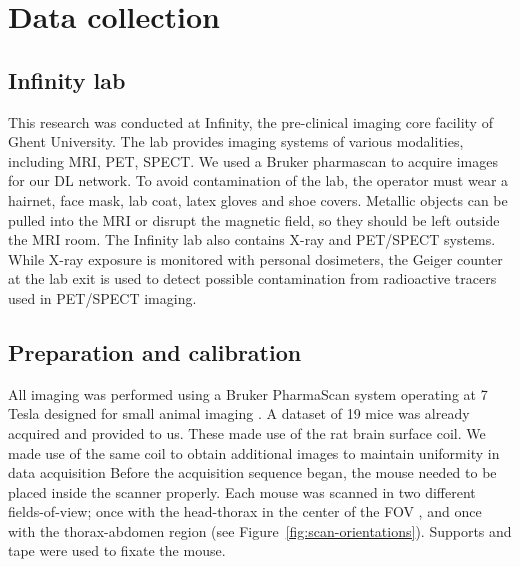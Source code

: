 \documentclass[twocolumn]{article}
\begin{document}
\section{Data collection}
\subsection{Infinity lab}

This research was conducted at Infinity, the pre-clinical imaging core facility of Ghent University. 
The lab provides imaging systems of various modalities, including MRI, PET, SPECT.
We used a Bruker pharmascan to acquire images for our DL network. To avoid contamination of the lab, the operator must wear a hairnet, face mask, lab coat, latex gloves and shoe covers. 
Metallic objects can be pulled into the MRI or disrupt the magnetic field, so they should be left outside the MRI room. 
The Infinity lab also contains X-ray and PET/SPECT systems. 
While X-ray exposure is monitored with personal dosimeters, the Geiger counter at the lab exit is used to detect possible contamination from radioactive tracers used in PET/SPECT imaging.

\subsection{Preparation and calibration }

All imaging was performed using a Bruker PharmaScan system operating at 7 Tesla designed for small animal imaging \cite{bruker2025pharmascan}. 
A dataset of 19 mice was already acquired and provided to us. These made use of the rat brain surface coil. We made use of the same coil to obtain additional images to maintain uniformity in data acquisition
Before the acquisition sequence began, the mouse needed to be placed inside the scanner properly. 
Each mouse was scanned in two different fields-of-view; once with the head-thorax in the center of the FOV , and once with the thorax-abdomen region (see Figure~\ref{fig:scan-orientations}). 
Supports and tape were used to fixate the mouse. 
\end{document}
